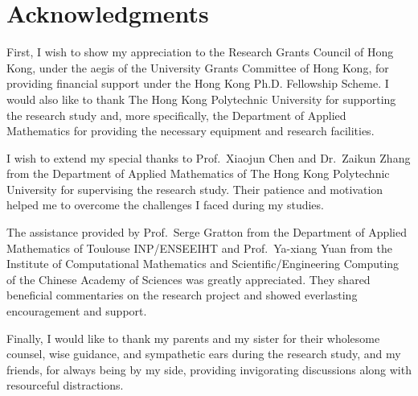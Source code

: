 %
%
%
\chapter*{Acknowledgments}
\label{ch:acknowledgments}

First, I wish to show my appreciation to the Research Grants Council of Hong Kong, under the aegis of the University Grants Committee of Hong Kong, for providing financial support under the Hong Kong Ph.D. Fellowship Scheme.
I would also like to thank The Hong Kong Polytechnic University for supporting the research study and, more specifically, the Department of Applied Mathematics for providing the necessary equipment and research facilities.

I wish to extend my special thanks to Prof.\ Xiaojun Chen and Dr.\ Zaikun Zhang from the Department of Applied Mathematics of The Hong Kong Polytechnic University for supervising the research study.
Their patience and motivation helped me to overcome the challenges I faced during my studies.

The assistance provided by Prof.\ Serge Gratton from the Department of Applied Mathematics of Toulouse INP/ENSEEIHT and Prof.\ Ya-xiang Yuan from the Institute of Computational Mathematics and Scientific/Engineering Computing of the Chinese Academy of Sciences was greatly appreciated.
They shared beneficial commentaries on the research project and showed everlasting encouragement and support.

Finally, I would like to thank my parents and my sister for their wholesome counsel, wise guidance, and sympathetic ears during the research study, and my friends, for always being by my side, providing invigorating discussions along with resourceful distractions.
